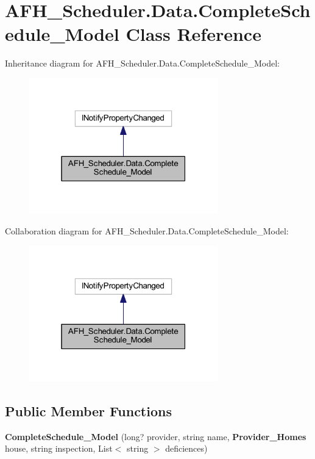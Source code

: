 \section{A\+F\+H\+\_\+\+Scheduler.\+Data.\+Complete\+Schedule\+\_\+\+Model Class Reference}
\label{class_a_f_h___scheduler_1_1_data_1_1_complete_schedule___model}


Inheritance diagram for A\+F\+H\+\_\+\+Scheduler.\+Data.\+Complete\+Schedule\+\_\+\+Model\+:
\nopagebreak
\begin{figure}[H]
\begin{center}
\leavevmode
\includegraphics[width=232pt]{class_a_f_h___scheduler_1_1_data_1_1_complete_schedule___model__inherit__graph}
\end{center}
\end{figure}


Collaboration diagram for A\+F\+H\+\_\+\+Scheduler.\+Data.\+Complete\+Schedule\+\_\+\+Model\+:
\nopagebreak
\begin{figure}[H]
\begin{center}
\leavevmode
\includegraphics[width=232pt]{class_a_f_h___scheduler_1_1_data_1_1_complete_schedule___model__coll__graph}
\end{center}
\end{figure}
\subsection*{Public Member Functions}
\begin{DoxyCompactItemize}
\item 
\textbf{ Complete\+Schedule\+\_\+\+Model} (long? provider, string name, \textbf{ Provider\+\_\+\+Homes} house, string inspection, List$<$ string $>$ deficiences)
\end{DoxyCompactItemize}
